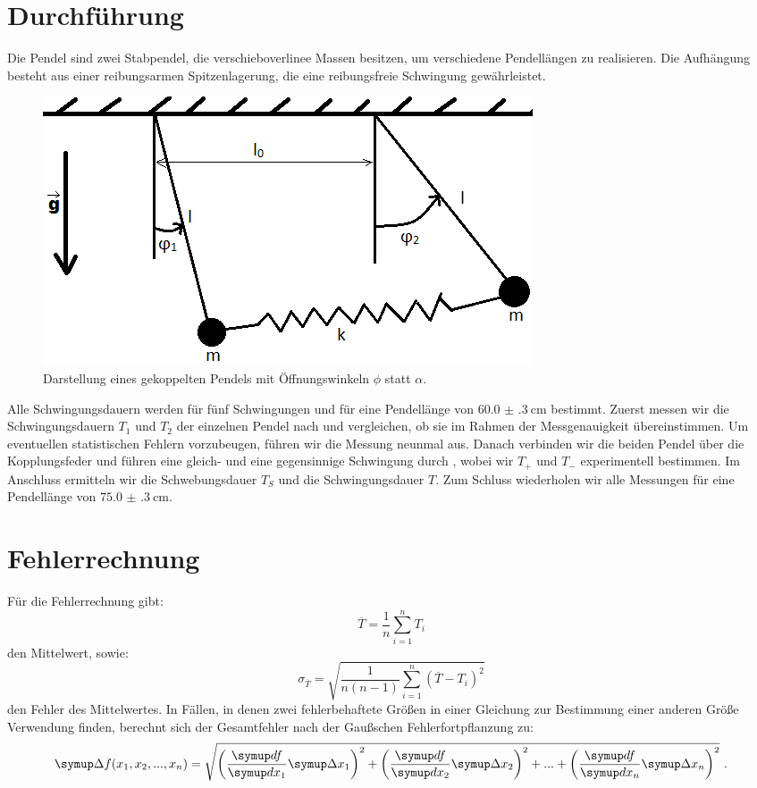 \section{Durchführung}
Die Pendel sind zwei Stabpendel, die verschieboverlinee Massen besitzen, um verschiedene Pendellängen zu realisieren. Die
Aufhängung besteht aus einer reibungsarmen Spitzenlagerung, die eine reibungsfreie Schwingung gewährleistet.
\begin{figure}[h]
  \centering
  \includegraphics{gekoppelte_pendel2.png}
  \caption{Darstellung eines gekoppelten Pendels mit Öffnungswinkeln $\phi$ statt $\alpha$.}
  \label{fig:skizze1}
\end{figure}
Alle Schwingungsdauern werden für fünf Schwingungen und für eine Pendellänge von $\SI{60.0(3)}{\centi\metre}$ bestimmt. Zuerst messen wir die Schwingungsdauern $\textit{T}_{1}$
und $\textit{T}_{2}$ der einzelnen Pendel nach und vergleichen, ob sie im Rahmen der Messgenauigkeit übereinstimmen. Um eventuellen
statistischen Fehlern vorzubeugen, führen wir die Messung neunmal aus. Danach verbinden wir die beiden Pendel über die Kopplungsfeder und führen eine gleich-
und eine gegensinnige Schwingung durch , wobei wir $\textit{T}_{+}$ und $\textit{T}_{-}$ experimentell bestimmen. Im
Anschluss ermitteln wir die Schwebungsdauer $\textit{T}_{S}$ und die Schwingungsdauer $\textit{T}$. Zum Schluss wiederholen wir
alle Messungen für eine Pendellänge von $\SI{75.0(3)}{\centi\metre}$.
\section{Fehlerrechnung}
Für die Fehlerrechnung gibt:
\begin{equation}
  \overline{T} = \frac{1}{n} \sum_{i=1}^{n} T_{i}
\end{equation}
den Mittelwert, sowie:
\begin{equation}
  \sigma_{\overline{T}} = \sqrt{\frac{1}{n(n-1)} \sum_{i=1}^{n}(\overline{T}-T_i)^2}
\end{equation}
den Fehler des Mittelwertes.
In Fällen, in denen zwei fehlerbehaftete Größen in einer Gleichung zur Bestimmung einer anderen Größe Verwendung finden, berechnt sich der Gesamtfehler
nach der Gaußschen Fehlerfortpflanzung zu:
\begin{equation}
    \symup \Delta f(x_1, x_2, ..., x_n) = \sqrt{\left(\frac{\symup df}{\symup dx_1} \symup \Delta
    x_1 \right)^2 +    \left(\frac{\symup df}{\symup dx_2} \symup \Delta
    x_2 \right)^2 + ... + \left(\frac{\symup df}{\symup dx_n} \symup \Delta x_n \right)^2} \ .
\end{equation}
